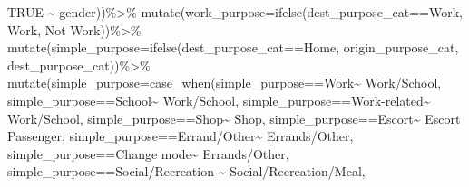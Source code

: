 \documentclass[
  12pt,
]{article}
\newenvironment{Shaded}{\begin{snugshade}}{\end{snugshade}}
\newcommand{\AttributeTok}[1]{\textcolor[rgb]{0.77,0.63,0.00}{#1}}
\newcommand{\ConstantTok}[1]{\textcolor[rgb]{0.00,0.00,0.00}{#1}}
\newcommand{\FunctionTok}[1]{\textcolor[rgb]{0.00,0.00,0.00}{#1}}
\newcommand{\NormalTok}[1]{#1}
\newcommand{\SpecialCharTok}[1]{\textcolor[rgb]{0.00,0.00,0.00}{#1}}
\newcommand{\StringTok}[1]{\textcolor[rgb]{0.31,0.60,0.02}{#1}}
\begin{document}
\begin{Shaded}
\begin{Highlighting}[]
                               \ConstantTok{TRUE} \SpecialCharTok{\textasciitilde{}}\NormalTok{ gender))}\SpecialCharTok{\%\textgreater{}\%}
  \FunctionTok{mutate}\NormalTok{(}\AttributeTok{work\_purpose=}\FunctionTok{ifelse}\NormalTok{(dest\_purpose\_cat}\SpecialCharTok{==}\StringTok{\textquotesingle{}Work\textquotesingle{}}\NormalTok{, }\StringTok{\textquotesingle{}Work\textquotesingle{}}\NormalTok{, }\StringTok{\textquotesingle{}Not Work\textquotesingle{}}\NormalTok{))}\SpecialCharTok{\%\textgreater{}\%}
  \FunctionTok{mutate}\NormalTok{(}\AttributeTok{simple\_purpose=}\FunctionTok{ifelse}\NormalTok{(dest\_purpose\_cat}\SpecialCharTok{==}\StringTok{\textquotesingle{}Home\textquotesingle{}}\NormalTok{, origin\_purpose\_cat, dest\_purpose\_cat))}\SpecialCharTok{\%\textgreater{}\%}
  \FunctionTok{mutate}\NormalTok{(}\AttributeTok{simple\_purpose=}\FunctionTok{case\_when}\NormalTok{(simple\_purpose}\SpecialCharTok{==}\StringTok{\textquotesingle{}Work\textquotesingle{}}\SpecialCharTok{\textasciitilde{}} \StringTok{\textquotesingle{}Work/School\textquotesingle{}}\NormalTok{,}
\NormalTok{                                  simple\_purpose}\SpecialCharTok{==}\StringTok{\textquotesingle{}School\textquotesingle{}}\SpecialCharTok{\textasciitilde{}} \StringTok{\textquotesingle{}Work/School\textquotesingle{}}\NormalTok{,}
\NormalTok{                                  simple\_purpose}\SpecialCharTok{==}\StringTok{\textquotesingle{}Work{-}related\textquotesingle{}}\SpecialCharTok{\textasciitilde{}} \StringTok{\textquotesingle{}Work/School\textquotesingle{}}\NormalTok{,}
\NormalTok{                                  simple\_purpose}\SpecialCharTok{==}\StringTok{\textquotesingle{}Shop\textquotesingle{}}\SpecialCharTok{\textasciitilde{}} \StringTok{\textquotesingle{}Shop\textquotesingle{}}\NormalTok{,}
\NormalTok{                                  simple\_purpose}\SpecialCharTok{==}\StringTok{\textquotesingle{}Escort\textquotesingle{}}\SpecialCharTok{\textasciitilde{}} \StringTok{\textquotesingle{}Escort Passenger\textquotesingle{}}\NormalTok{,}
\NormalTok{                                  simple\_purpose}\SpecialCharTok{==}\StringTok{\textquotesingle{}Errand/Other\textquotesingle{}}\SpecialCharTok{\textasciitilde{}} \StringTok{\textquotesingle{}Errands/Other\textquotesingle{}}\NormalTok{,}
\NormalTok{                                  simple\_purpose}\SpecialCharTok{==}\StringTok{\textquotesingle{}Change mode\textquotesingle{}}\SpecialCharTok{\textasciitilde{}} \StringTok{\textquotesingle{}Errands/Other\textquotesingle{}}\NormalTok{,}
\NormalTok{                                  simple\_purpose}\SpecialCharTok{==}\StringTok{\textquotesingle{}Social/Recreation\textquotesingle{}} \SpecialCharTok{\textasciitilde{}} \StringTok{\textquotesingle{}Social/Recreation/Meal\textquotesingle{}}\NormalTok{,}

\end{Highlighting}
\end{Shaded}
\end{document}
